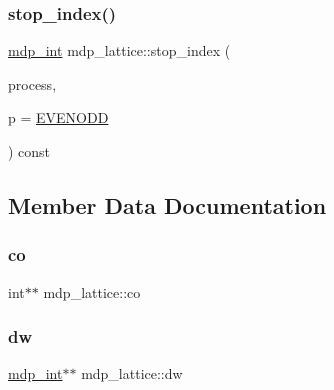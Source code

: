 \mbox{\label{classmdp__lattice_ac98aa2e5b78ce3b478935e0e8e0e808a}} 
\subsubsection{\texorpdfstring{stop\+\_\+index()}{stop\_index()}}
{\footnotesize\ttfamily \hyperlink{mdp__global__vars_8h_aaa1ad9d0dcd2124aa5af0120d9954174}{mdp\+\_\+int} mdp\+\_\+lattice\+::stop\+\_\+index (\begin{DoxyParamCaption}\item[{const int}]{process,  }\item[{int}]{p = {\ttfamily \hyperlink{mdp__global__vars_8h_a4c9de81f2de5a74b588107b6c0afb9ee}{E\+V\+E\+N\+O\+DD}} }\end{DoxyParamCaption}) const\hspace{0.3cm}{\ttfamily [inline]}}



\subsection{Member Data Documentation}
\mbox{\label{classmdp__lattice_ad4cffbef2302b39176943a783c8f4ecc}} 
\subsubsection{\texorpdfstring{co}{co}}
{\footnotesize\ttfamily int$\ast$$\ast$ mdp\+\_\+lattice\+::co}

\mbox{\label{classmdp__lattice_a5fb45161a272c08b81eafca224546673}} 
\subsubsection{\texorpdfstring{dw}{dw}}
{\footnotesize\ttfamily \hyperlink{mdp__global__vars_8h_aaa1ad9d0dcd2124aa5af0120d9954174}{mdp\+\_\+int}$\ast$$\ast$ mdp\+\_\+lattice\+::dw}

\mbox{\label{classmdp__lattice_aac1057478186764ece27e33d1a215a7d}} 
